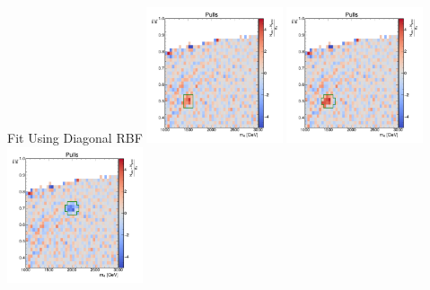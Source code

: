 \documentclass[10pt]{beamer}
\begin{document}
\begin{frame}{Fit Using Diagonal RBF}
  \makegrid%
  {}%
  {\includegraphics[width=0.3\textwidth]{figures/2dpullplots/rbf/E_1500_0p5_100_0p05.pdf}}%
  {\includegraphics[width=0.3\textwidth]{figures/2dpullplots/rbf/E_1500_0p5_150_0p05.pdf}}%
  { }%
  {\includegraphics[width=0.3\textwidth]{figures/2dpullplots/rbf/E_2000_0p7_150_0p05.pdf}}%

\end{frame}
\end{document}

